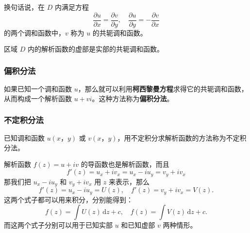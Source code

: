 换句话说，在 \(D\) 内满足方程 \[
\frac{\partial u}{\partial x} = \frac{\partial v}{\partial y} ,\quad \frac{\partial u}{\partial y} = -\frac{\partial v}{\partial x}
\] 的两个调和函数中，\(v\) 称为 \(u\) 的共轭调和函数。

\begin{tcolorbox}[title={Note},colback=red!5!white
,colframe=red!75!black
,colbacktitle=yellow!50!red
,coltitle=red!25!black, fonttitle=\bfseries,subtitle style={boxrule=0.4pt, colback=yellow!50!red!25!white}]
区域 \(D\) 内的解析函数的虚部是实部的共轭调和函数。

\end{tcolorbox}
\subsubsection{偏积分法}
\label{偏积分法}
如果已知一个调和函数
\(u\)，那么就可以利用\textbf{柯西黎曼方程}求得它的共轭调和函数，从而构成一个解析函数
\(u+vi\)。这种方法称为\textbf{偏积分法}。
\subsubsection{不定积分法}
\label{不定积分法}
已知调和函数 \(u(x，y)\) 或
\(v(x，y)\)，用不定积分求解析函数的方法称为不定积分法。

\begin{tcolorbox}[title={具体过程},colback=red!5!white
,colframe=red!75!black
,colbacktitle=yellow!50!red
,coltitle=red!25!black, fonttitle=\bfseries,subtitle style={boxrule=0.4pt, colback=yellow!50!red!25!white}]
解析函数 \(f(z)=u+iv\) 的导函数也是解析函数，而且
\[
f'(z) = u_x + iv_x = u_x - iu_y = v_y + iv_x
\]
那我们把 \(u_x - iu_y\) 和 \(v_y + iv_x\) 用 \(z\) 来表示，那么
\[
f'(z) = u_x - iu_y = U(z), \quad f'(z) = v_y + iv_x = V(z).
\]
这两个式子都可以用来积分，分别能得到：
\[
f(z) = \int U(z)\,\mathrm{d}z+c,\quad f(z) = \int V(z)\,\mathrm{d}z+c.
\]
而这两个式子分别可以用于已知实部 \(u\) 和已知虚部 \(v\) 两种情形。

\end{tcolorbox}
